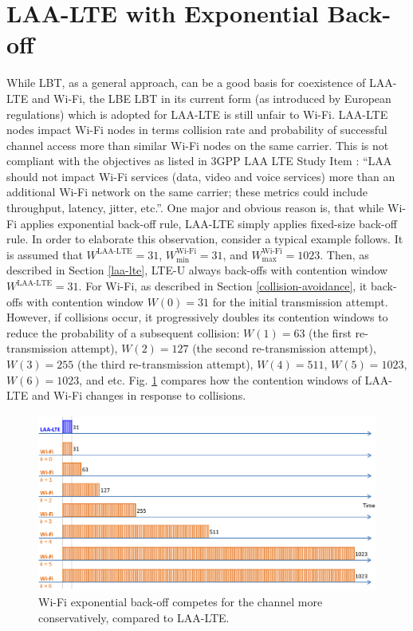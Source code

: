 \section{LAA-LTE with Exponential Back-off}
\label{subsection:exp-back-off}

While LBT, as a general approach, can be a good basis for coexistence of \mbox{LAA-LTE} and \mbox{Wi-Fi}, the LBE LBT in its current form (as introduced by European regulations) which is adopted for \mbox{LAA-LTE} is still unfair to \mbox{Wi-Fi}. \mbox{LAA-LTE} nodes impact \mbox{Wi-Fi} nodes in terms collision rate and probability of successful channel access more than similar \mbox{Wi-Fi} nodes on the same carrier. This is not compliant with the objectives as listed in 3GPP LAA LTE Study Item \cite{LAA-LTE-SI}: ``LAA should not impact \mbox{Wi-Fi} services (data, video and voice services) more than an additional \mbox{Wi-Fi} network on the same carrier; these metrics could include throughput, latency, jitter, etc.''. One major and obvious reason is, that while \mbox{Wi-Fi} applies exponential back-off rule, \mbox{LAA-LTE} simply applies fixed-size back-off rule. In order to elaborate this observation, consider a typical example follows. It is assumed that $W^{\mathrm{\mbox{LAA-LTE}}}=31$, $W^{\mbox{Wi-Fi}}_{\min}=31$, and $W^{\mathrm{\mbox{Wi-Fi}}}_{\max}=1023$. Then, as described in Section \ref{laa-lte}, \mbox{LTE-U} always back-offs with contention window $W^{\mathrm{\mbox{LAA-LTE}}}=31$. For \mbox{Wi-Fi}, as described in Section \ref{collision-avoidance}, it back-offs with contention window $W(0)=31$ for the initial transmission attempt. However, if collisions occur, it progressively doubles its contention windows to reduce the probability of a subsequent collision: $W(1)=63$ (the first re-transmission attempt), $W(2)=127$ (the second re-transmission attempt), $W(3)=255$ (the third re-transmission attempt), $W(4)=511$, $W(5)=1023$, $W(6)=1023$, and etc. Fig. \ref{figs:LAA-LTE-enhacement-back-off} compares how the contention windows of \mbox{LAA-LTE} and \mbox{Wi-Fi} changes in response to collisions.
\begin{figure}[!ht]
	\centering
	\includegraphics[width=1.0\columnwidth]{figs/LAA-LTE-enhacement-back-off}
	\caption{\mbox{Wi-Fi} exponential back-off competes for the channel more conservatively, compared to \mbox{LAA-LTE}.}
	\label{figs:LAA-LTE-enhacement-back-off}
\end{figure}

